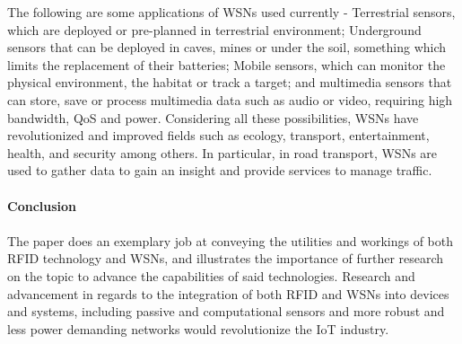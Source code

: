 \documentclass[12pt, letterpaper]{article}
\begin{document}
The following are some applications of WSNs used currently - 
Terrestrial sensors, which are deployed or
pre-planned in terrestrial environment; Underground sensors that can be deployed in caves, mines or
under the soil, something which limits the replacement of their batteries; Mobile sensors, which can
monitor the physical environment, the habitat or track a target; and multimedia sensors that can store,
save or process multimedia data such as audio or video, requiring high bandwidth, QoS and power.
Considering all these possibilities, WSNs have revolutionized and improved fields such as ecology,
transport, entertainment, health, and security among others. In particular, in road transport, WSNs are
used to gather data to gain an insight and provide services to manage traffic.
\\ \ \\
\textbf{Conclusion}
\\ \ \\
The paper does an exemplary job at conveying the utilities and workings of both RFID technology and WSNs,
and illustrates the importance of further research on the topic to advance the capabilities of said technologies.
Research and advancement in regards to the integration of both RFID and WSNs into devices and systems, including passive
and computational sensors and more robust and less power demanding networks would revolutionize the IoT industry.
\end{document}
